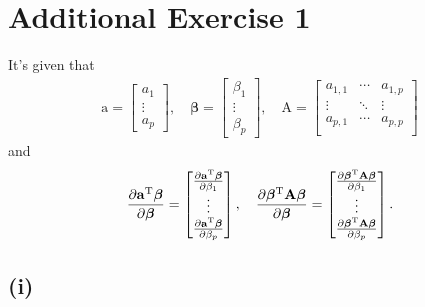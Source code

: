 \section*{Additional Exercise 1}
It's given that
\begin{align*}
\bm{\mathrm{a}} = 
\begin{bmatrix}
a_1\\
\vdots\\
a_p
\end{bmatrix}
, \quad
\bm{\beta} = 
\begin{bmatrix}
\beta_1\\
\vdots\\
\beta_p
\end{bmatrix}
, \quad
\bm{\mathrm{A}} =
\begin{bmatrix}
a_{1,1} & \cdots & a_{1,p} \\
\vdots & \ddots & \vdots \\
a_{p,1} & \cdots & a_{p,p} \\
\end{bmatrix}
\end{align*}
and
\begin{align*}
\frac{\partial \bm{\mathrm{a}}^{\rm T}\bm{\beta}}{\partial \bm{\beta}}
=
\begin{bmatrix}
\frac{\partial \bm{\mathrm{a}}^{\rm T}\bm{\beta}}{\partial \beta_{1}}\\
\vdots\\
\frac{\partial \bm{\mathrm{a}}^{\rm T}\bm{\beta}}{\partial \beta_{p}}\\
\end{bmatrix}
, \quad
\frac{\partial \bm{\beta}^{\rm T}\bm{\mathrm{A}}\bm{\beta}}{\partial \bm{\beta}}
=
\begin{bmatrix}
\frac{\partial \bm{\beta}^{\rm T}\bm{\mathrm{A}}\bm{\beta}}{\partial \beta_{1}}\\
\vdots\\
\frac{\partial \bm{\beta}^{\rm T}\bm{\mathrm{A}}\bm{\beta}}{\partial \beta_{p}}\\
\end{bmatrix}
.
\end{align*}


\subsection*{(i)}


